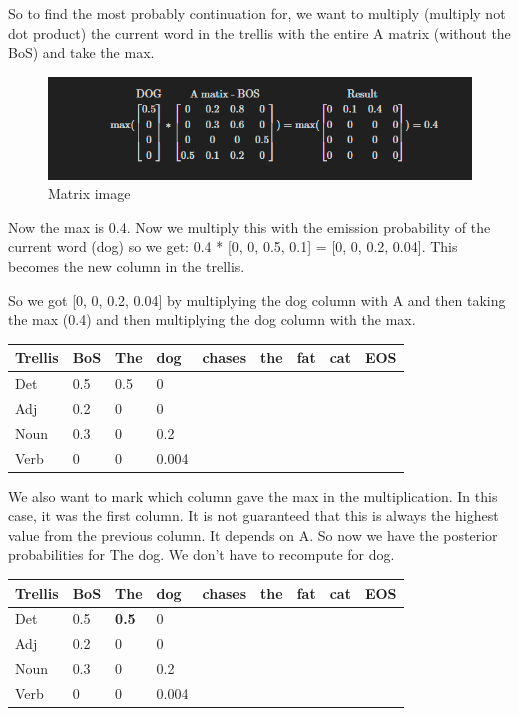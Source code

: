 \documentclass[
  11pt,
  british,
]{article}
\begin{document}
So to find the most probably continuation for, we want to multiply
(multiply not dot product) the current word in the trellis with the
entire A matrix (without the BoS) and take the max.

\begin{figure}
\centering
\includegraphics{viterbi-matrix.png}
\caption{Matrix image}
\end{figure}

Now the max is 0.4. Now we multiply this with the emission probability
of the current word (dog) so we get: 0.4 * {[}0, 0, 0.5, 0.1{]} = {[}0,
0, 0.2, 0.04{]}. This becomes the new column in the trellis.

So we got {[}0, 0, 0.2, 0.04{]} by multiplying the dog column with A and
then taking the max (0.4) and then multiplying the dog column with the
max.

\begin{longtable}[]{@{}lllllllll@{}}
\toprule
Trellis & BoS & The & dog & chases & the & fat & cat & EOS \\
\midrule
\endhead
Det & 0.5 & 0.5 & 0 & & & & & \\
Adj & 0.2 & 0 & 0 & & & & & \\
Noun & 0.3 & 0 & 0.2 & & & & & \\
Verb & 0 & 0 & 0.004 & & & & & \\
\bottomrule
\end{longtable}

We also want to mark which column gave the max in the multiplication. In
this case, it was the first column. It is not guaranteed that this is
always the highest value from the previous column. It depends on A. So
now we have the posterior probabilities for The dog. We don't have to
recompute for dog.

\begin{longtable}[]{@{}lllllllll@{}}
\toprule
Trellis & BoS & The & dog & chases & the & fat & cat & EOS \\
\midrule
\endhead
Det & 0.5 & \textbf{0.5} & 0 & & & & & \\
Adj & 0.2 & 0 & 0 & & & & & \\
Noun & 0.3 & 0 & 0.2 & & & & & \\
Verb & 0 & 0 & 0.004 & & & & & \\
\bottomrule
\end{longtable}
\end{document}
